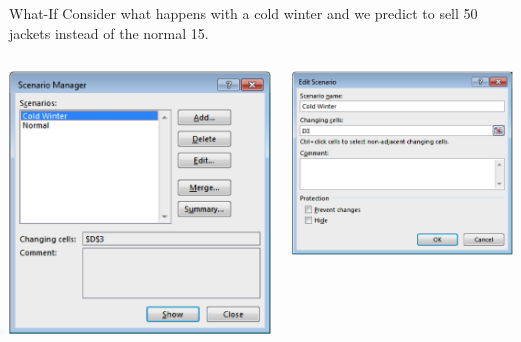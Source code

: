 \documentclass[xcolor=svgnames]{beamer}
\newcommand{\red}[1]{\textcolor{red}{#1}}
\begin{document}

\begin{frame}{What-If}
Consider what happens with a cold winter and we predict to sell 50 jackets instead of the normal 15. %
\begin{columns}[T] %
\begin{column}{.48\textwidth}
\hspace*{10mm}\includegraphics[width=.9\textwidth]{whatif1.png}
\end{column}%
\hfill%
\begin{column}{.48\textwidth}
\hspace*{-6mm}\includegraphics[width=.9\textwidth]{whatif2.png}\\

\end{column}
\end{columns}
\end{frame}
\end{document}
